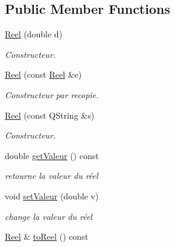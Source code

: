 \subsection*{Public Member Functions}
\begin{DoxyCompactItemize}
\item 
\hyperlink{classNombre_1_1Reel_a7435c6c760397d4a481e5f8a684da18d}{Reel} (double d)
\begin{DoxyCompactList}\small\item\em Constructeur. \item\end{DoxyCompactList}\item 
\hyperlink{classNombre_1_1Reel_a4343cb0e3dc44c60a4a6239da218b196}{Reel} (const \hyperlink{classNombre_1_1Reel}{Reel} \&e)
\begin{DoxyCompactList}\small\item\em Constructeur par recopie. \item\end{DoxyCompactList}\item 
\hyperlink{classNombre_1_1Reel_a810be76247a67b0bcea16e94bc734fc2}{Reel} (const QString \&s)
\begin{DoxyCompactList}\small\item\em Constructeur. \item\end{DoxyCompactList}\item 
\hypertarget{classNombre_1_1Reel_afa1b08befdd635d236ee485df5d39574}{
double \hyperlink{classNombre_1_1Reel_afa1b08befdd635d236ee485df5d39574}{getValeur} () const }
\label{classNombre_1_1Reel_afa1b08befdd635d236ee485df5d39574}

\begin{DoxyCompactList}\small\item\em retourne la valeur du réel \item\end{DoxyCompactList}\item 
void \hyperlink{classNombre_1_1Reel_a7c8c6736be61f1bb9583bb2f67310d24}{setValeur} (double v)
\begin{DoxyCompactList}\small\item\em change la valeur du réel \item\end{DoxyCompactList}\item 
\hypertarget{classNombre_1_1Reel_a199da1c39952cf57288d594dc216050a}{
\hyperlink{classNombre_1_1Reel}{Reel} \& \hyperlink{classNombre_1_1Reel_a199da1c39952cf57288d594dc216050a}{toReel} () const }
\label{classNombre_1_1Reel_a199da1c39952cf57288d594dc216050a}


\end{DoxyCompactItemize}
